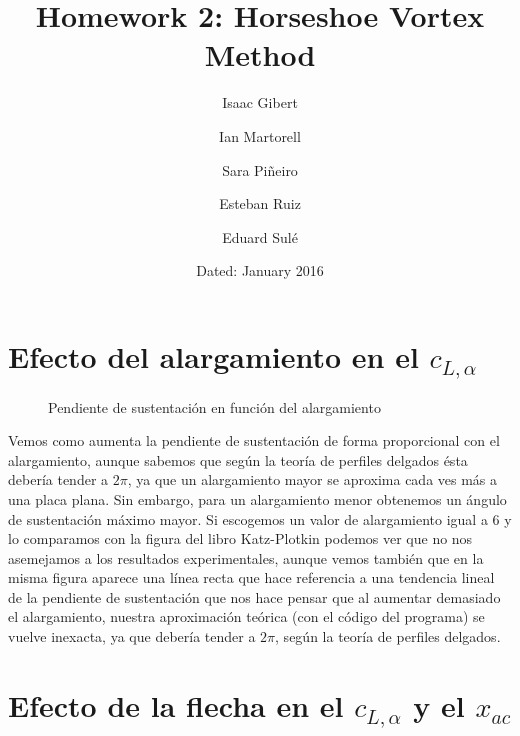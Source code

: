 \documentclass[9pt, a4paper]{article}
\begin{document}
\author{Isaac Gibert}
\author{Ian Martorell}
\author{Sara Piñeiro}
\author{Esteban Ruiz}
\author{Eduard Sulé}
\title{Homework 2: Horseshoe Vortex Method}
\date{Dated: January 2016}
\maketitle

\section{Efecto del alargamiento en el $c_{L,\alpha}$}

\begin{figure}[H]
  \begin{center}
    \caption{Pendiente de sustentación en función del alargamiento}
    \label{fig:hw2_1}
  \end{center}
\end{figure}

Vemos como aumenta la pendiente de sustentación de forma proporcional con el alargamiento, aunque sabemos que según la teoría de perfiles delgados ésta debería tender a $2\pi$, ya que un alargamiento mayor se aproxima cada ves más a una placa plana. Sin embargo, para un alargamiento menor obtenemos un ángulo de sustentación máximo mayor. Si escogemos un valor de alargamiento igual a 6 y lo comparamos con la figura del libro Katz-Plotkin podemos ver que no nos asemejamos a los resultados experimentales,
aunque vemos también que en la misma figura aparece una línea recta que hace referencia a una tendencia lineal de la pendiente de sustentación que nos hace pensar que al aumentar demasiado el alargamiento, nuestra aproximación teórica (con el código del programa) se vuelve inexacta, ya que debería tender a $2\pi$, según la teoría de perfiles delgados.

\section{Efecto de la flecha en el $c_{L,\alpha}$ y el $x_{ac}$}
\end{document}
